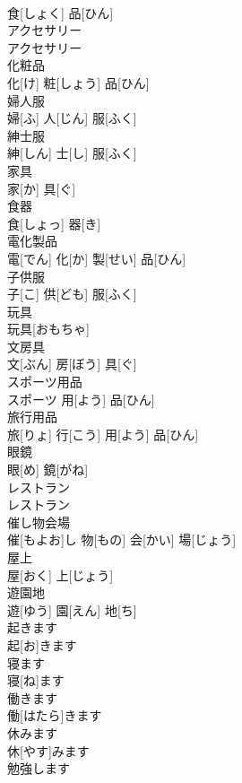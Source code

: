 \documentclass[8pt]{extreport}
\begin{document}
\begin{CJK}{UTF8}{min}
\\	食[しょく] 品[ひん]		
\\	アクセサリー	
\\	アクセサリー		
\\	化粧品	
\\	化[け] 粧[しょう] 品[ひん]		
\\	婦人服	
\\	婦[ふ] 人[じん] 服[ふく]		
\\	紳士服	
\\	紳[しん] 士[し] 服[ふく]		
\\	家具	
\\	家[か] 具[ぐ]		
\\	食器	
\\	食[しょっ] 器[き]		
\\	電化製品	
\\	電[でん] 化[か] 製[せい] 品[ひん]		
\\	子供服	
\\	子[こ] 供[ども] 服[ふく]		
\\	玩具	
\\	玩具[おもちゃ]		
\\	文房具	
\\	文[ぶん] 房[ぼう] 具[ぐ]		
\\	スポーツ用品	
\\	スポーツ 用[よう] 品[ひん]		
\\	旅行用品	
\\	旅[りょ] 行[こう] 用[よう] 品[ひん]		
\\	眼鏡	
\\	眼[め] 鏡[がね]		
\\	レストラン	
\\	レストラン		
\\	催し物会場	
\\	催[もよお]し 物[もの] 会[かい] 場[じょう]		
\\	屋上	
\\	屋[おく] 上[じょう]		
\\	遊園地	
\\	遊[ゆう] 園[えん] 地[ち]		
\\	起きます	
\\	起[お]きます		
\\	寝ます	
\\	寝[ね]ます		
\\	働きます	
\\	働[はたら]きます		
\\	休みます	
\\	休[やす]みます		
\\	勉強します	

\end{CJK}
\end{document}
